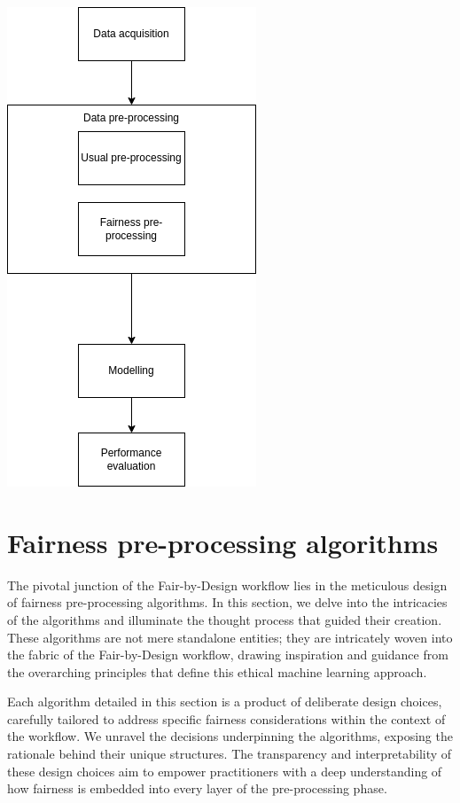 \documentclass[12pt,a4paper,openright,twoside]{book}
\begin{document}
\begin{center}

\includegraphics[width=.5\textwidth, height=1.0\textwidth]{fairness-workflow.png}

\end{center}

\newpage
\section{Fairness pre-processing algorithms}
\label{section:fairness}

The pivotal junction of the Fair-by-Design workflow lies in the meticulous design of fairness pre-processing algorithms. In this section, we delve into the intricacies of the algorithms and illuminate the thought process that guided their creation. These algorithms are not mere standalone entities; they are intricately woven into the fabric of the Fair-by-Design workflow, drawing inspiration and guidance from the overarching principles that define this ethical machine learning approach.

Each algorithm detailed in this section is a product of deliberate design choices, carefully tailored to address specific fairness considerations within the context of the workflow. We unravel the decisions underpinning the algorithms, exposing the rationale behind their unique structures. The transparency and interpretability of these design choices aim to empower practitioners with a deep understanding of how fairness is embedded into every layer of the pre-processing phase.
\end{document}
